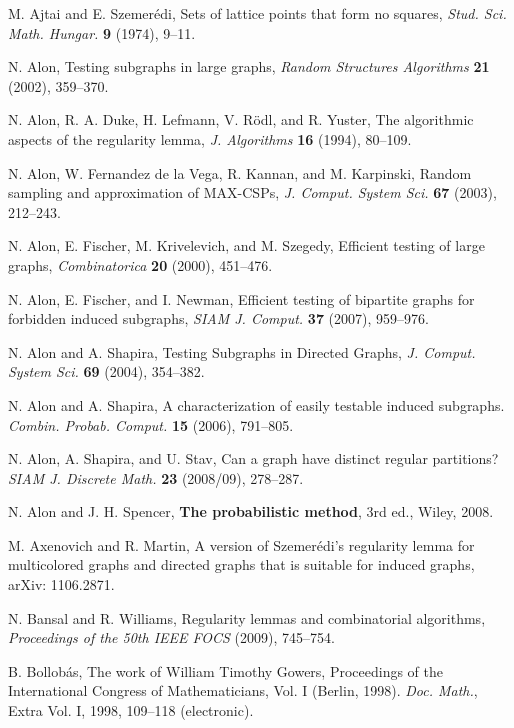 \documentclass[11pt]{article}
\begin{document}
\begin{thebibliography}{}

M. Ajtai and E. Szemer\'edi, Sets of lattice points that form no squares, {\it
Stud. Sci. Math. Hungar.} {\bf 9} (1974), 9--11.

N. Alon, Testing subgraphs in large graphs, {\it Random Structures Algorithms}
{\bf 21} (2002), 359--370.

 N. Alon, R. A. Duke, H. Lefmann, V. R\"odl, and R. Yuster, The
algorithmic aspects of the regularity lemma,
{\it J. Algorithms} {\bf 16} (1994), 80--109.

 N. Alon, W. Fernandez de la Vega, R. Kannan, and M. Karpinski,
Random sampling and approximation of MAX-CSPs, {\it J. Comput. System Sci.}
{\bf 67} (2003), 212--243.

 N. Alon, E. Fischer, M. Krivelevich, and M. Szegedy,
Efficient testing of large graphs, {\it Combinatorica} {\bf 20} (2000),
451--476.

N. Alon, E. Fischer, and I. Newman,
Efficient testing of bipartite graphs for forbidden induced subgraphs, {\it
SIAM J. Comput.} {\bf 37} (2007), 959--976.

N. Alon and A. Shapira, Testing Subgraphs in Directed Graphs,
{\it J. Comput. System Sci.} {\bf 69} (2004), 354--382.

N. Alon and A. Shapira, A characterization of easily testable induced
subgraphs. {\it Combin. Probab. Comput.} {\bf 15} (2006), 791--805.

N. Alon, A. Shapira, and U.  Stav, Can a graph have distinct regular
partitions? {\it SIAM J. Discrete Math.} {\bf 23} (2008/09), 278--287.

 N. Alon and J. H. Spencer, {\bf The probabilistic method}, 3rd
ed., Wiley, 2008.

M. Axenovich and R. Martin,
A version of Szemer\'edi's regularity lemma for multicolored graphs and
directed graphs that is suitable for induced graphs, arXiv: 1106.2871.


N. Bansal and R. Williams, Regularity lemmas and combinatorial algorithms,
{\it Proceedings of the 50th IEEE FOCS} (2009), 745--754.

 B. Bollob\'as, The work of William Timothy Gowers, Proceedings of
the International Congress of Mathematicians, Vol. I (Berlin, 1998). {\it Doc.
Math.}, Extra Vol. I, 1998, 109--118 (electronic).


\end{thebibliography}
\end{document}

